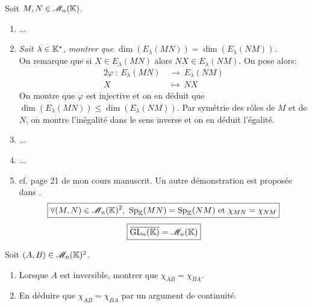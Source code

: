 Soit $M, N \in \mathscr{M}_n(\mathbb{K})$. 
\begin{enumerate}
    \item ...
    \item \emph{Soit $\lambda \in \mathbb{K}^\star$, montrer que $\dim(E_\lambda (MN)) = \dim(E_\lambda (NM))$.} \\
    On remarque que si $X \in E_\lambda (MN)$ alors $NX \in E_\lambda (NM)$. On pose alors:
    \begin{alignat*}{2}
        \varphi\ :\ E_\lambda (MN)\ &\longrightarrow\ E_\lambda (NM)\\
        X\ &\longmapsto\ NX
    \end{alignat*}
    On montre que $\varphi$ est injective et on en déduit que $\dim(E_\lambda (MN)) \leqslant \dim(E_\lambda (NM))$. Par symétrie des rôles de $M$ et de $N$, on montre l'inégalité dans le sens inverse et on en déduit l'égalité.
    \item ...
    \item ...
    \item cf. page 21 de mon cours manuscrit. Un autre démonstration est proposée dans .
    $$\boxed{\forall (M, N) \in \mathscr{M}_n(\mathbb{K})^2,\ \mathrm{Sp}_{\mathbb{K}}(MN) = \mathrm{Sp}_{\mathbb{K}}(NM) \text{ et } \chi_{MN} = \chi_{NM}}$$
    $$\boxed{\overline{\mathrm{GL}_n(\mathbb{K})} = \mathscr{M}_n(\mathbb{K})}$$
\end{enumerate}

\begin{exercice}
    Soit $(A, B) \in \mathscr{M}_n(\mathbb{K})^2$.
    \begin{enumerate}
        \item Lorsque $A$ est inversible, montrer que $\chi_{AB}=\chi_{BA}$.
        \item En déduire que $\chi_{AB}=\chi_{BA}$ par un argument de continuité.
    \end{enumerate}
\end{exercice}

